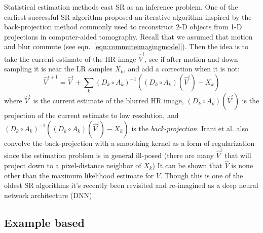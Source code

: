 Statistical estimation methods cast SR as an inference problem.
%
One of the earliest successful SR algorithm\cite{Irani1991ImprovingRB} proposed an iterative algorithm inspired by the back-projection method commonly used to reconstruct 2-D objects from 1-D projections in computer-aided tomography.
%
Recall that we assumed that motion and blur commute (see eqn.~\ref{eqn:commuteimagingmodel}).
%
Then the idea is to take the current estimate of the HR image $\hat{V}^{i}$, see if after motion and down-sampling it is near the LR samples $X_k$, and add a correction when it is not:
\begin{equation}
    \hat{V}^{i+1} = \hat{V}^i + \sum_k (D_k \circ A_k)^{-1}\left( (D_k \circ A_k)(\hat{V}^i) - X_k \right)
\end{equation}
where $\hat{V}^i$ is the current estimate of the blurred HR image, $(D_k \circ A_k)(\hat{V}^i)$ is the projection of the current estimate to low resolution, and $(D_k \circ A_k)^{-1}\left( (D_k \circ A_k)(\hat{V}^i) - X_k \right)$ is the \textit{back-projection}.
%
Irani et al.\cite{Irani1991ImprovingRB} also convolve the back-projection with a smoothing kernel as a form of regularization since the estimation problem is in general ill-posed (there are many $\hat{V}^{i}$ that will project down to a pixel-distance neighbor of $X_k$)
%
It can be shown\cite{Elad1996} that $\hat{V}$ is none other than the maximum likelihood estimate for $V$.
%
Though this is one of the oldest SR algorithms it's recently been revisited and re-imagined as a deep neural network architecture (DNN)\cite{DBLP:journals.corr.abs-1803-02735}.


%

\subsection{Example based}
